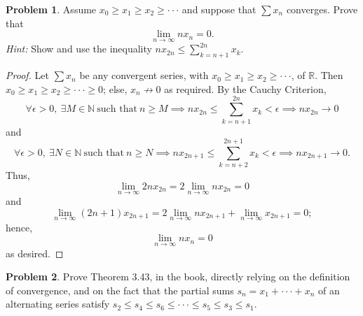 \documentclass{amsart}
\theoremstyle{definition}
\newtheorem{problem}{Problem}
\begin{document}
\begin{problem}
    Assume $x_0 \geq x_1 \geq x_2 \geq \cdot \cdot \cdot$ and suppose that $\sum x_n$ converges. Prove that
    \[
    \lim_{n \to \infty}nx_n = 0.
    \]
    \textit{Hint:} Show and use the inequality $nx_{2n} \leq \sum_{k=n+1}^{2n}x_k$.
\end{problem}

\begin{proof}
    Let $\sum x_n$ be any convergent series, with $x_0 \geq x_1 \geq x_2 \geq \cdot \cdot \cdot$, of $\mathbb{R}$. Then $x_0 \geq x_1 \geq x_2 \geq \cdot \cdot \cdot \geq 0$; else, $x_n \not \to 0$ as required. By the Cauchy Criterion,
    \[
    \forall \epsilon > 0, \ \exists M \in \mathbb{N} \ \text{such that} \ n \geq M \implies nx_{2n} \leq \sum_{k = n+1}^{2n}x_k < \epsilon \implies nx_{2n} \to 0
    \]
    and 
    \[
    \forall \epsilon > 0, \ \exists N \in \mathbb{N} \ \text{such that} \ n \geq N \implies nx_{2n+1} \leq \sum_{k = n+2}^{2n+1}x_k < \epsilon \implies nx_{2n+1} \to 0.
    \]
    Thus, 
    \[
    \lim_{n \to \infty}2nx_{2n} = 2\lim_{n \to \infty}nx_{2n} = 0
    \]
    and 
    \[
    \lim_{n \to \infty}(2n+1)x_{2n+1} = 2\lim_{n \to \infty}nx_{2n+1} + \lim_{n \to \infty}x_{2n+1} = 0;
    \]
    hence,
    \[
    \lim_{n \to \infty}nx_n = 0
    \]
    as desired.
\end{proof}

\begin{problem}
    Prove Theorem 3.43, in the book, directly relying on the definition of convergence, and on the fact that the partial sums $s_n = x_1 + \cdot \cdot \cdot + x_n$ of an alternating series satisfy $s_2 \leq s_4 \leq s_6 \leq \cdot \cdot \cdot \leq s_5 \leq s_3 \leq s_1$.
\end{problem}
\end{document}
